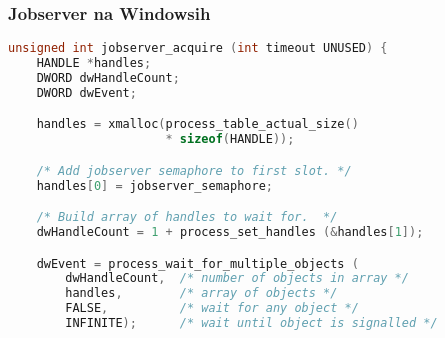 \documentclass{beamer}
\begin{document}
\begin{frame}[fragile]
  \frametitle{Jobserver na Windowsih}

\begin{lstlisting}[language=C, basicstyle=\footnotesize]
unsigned int jobserver_acquire (int timeout UNUSED) {
    HANDLE *handles;
    DWORD dwHandleCount;
    DWORD dwEvent;

    handles = xmalloc(process_table_actual_size()
                      * sizeof(HANDLE));

    /* Add jobserver semaphore to first slot. */
    handles[0] = jobserver_semaphore;

    /* Build array of handles to wait for.  */
    dwHandleCount = 1 + process_set_handles (&handles[1]);

    dwEvent = process_wait_for_multiple_objects (
        dwHandleCount,  /* number of objects in array */
        handles,        /* array of objects */
        FALSE,          /* wait for any object */
        INFINITE);      /* wait until object is signalled */

\end{lstlisting}
\end{frame}
\end{document}
